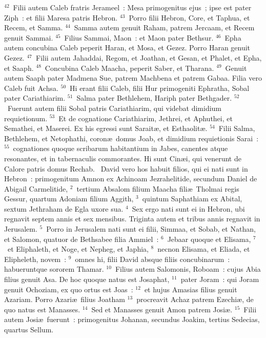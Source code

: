 ${}^{42}$~Filii autem Caleb fratris Jerameel~: Mesa primogenitus ejus~; ipse est pater Ziph~: et filii Maresa patris Hebron.
${}^{43}$~Porro filii Hebron, Core, et Taphua, et Recem, et Samma.
${}^{44}$~Samma autem genuit Raham, patrem Jercaam, et Recem genuit Sammai.
${}^{45}$~Filius Sammai, Maon~: et Maon pater Bethsur.
${}^{46}$~Epha autem concubina Caleb peperit Haran, et Mosa, et Gezez. Porro Haran genuit Gezez.
${}^{47}$~Filii autem Jahaddai, Regom, et Joathan, et Gesan, et Phalet, et Epha, et Saaph.
${}^{48}$~Concubina Caleb Maacha, peperit Saber, et Tharana.
${}^{49}$~Genuit autem Saaph pater Madmena Sue, patrem Machbena et patrem Gabaa. Filia vero Caleb fuit Achsa.
${}^{50}$~Hi erant filii Caleb, filii Hur primogeniti Ephratha, Sobal pater Cariathiarim.
${}^{51}$~Salma pater Bethlehem, Hariph pater Bethgader.
${}^{52}$~Fuerunt autem filii Sobal patris Cariathiarim, qui videbat dimidium requietionum.
${}^{53}$~Et de cognatione Cariathiarim, Jethrei, et Aphuthei, et Semathei, et Maserei. Ex his egressi sunt Sarait\ae , et Esthaolit\ae .
${}^{54}$~Filii Salma, Bethlehem, et Netophathi, coron\ae\ domus Joab, et dimidium requietionis Sarai~:
${}^{55}$~cognationes quoque scribarum habitantium in Jabes, canentes atque resonantes, et in tabernaculis commorantes. Hi sunt Cin\ae i, qui venerunt de Calore patris domus Rechab.
~David vero hos habuit filios, qui ei nati sunt in Hebron~: primogenitum Amnon ex Achinoam Jezrahelitide, secundum Daniel de Abigail Carmelitide,
${}^{2}$~tertium Absalom filium Maacha fili\ae\ Tholmai regis Gessur, quartum Adoniam filium Aggith,
${}^{3}$~quintum Saphathiam ex Abital, sextum Jethraham de Egla uxore sua.
${}^{4}$~Sex ergo nati sunt ei in Hebron, ubi regnavit septem annis et sex mensibus. Triginta autem et tribus annis regnavit in Jerusalem.
${}^{5}$~Porro in Jerusalem nati sunt ei filii, Simmaa, et Sobab, et Nathan, et Salomon, quatuor de Bethsabee filia Ammiel~:
${}^{6}$~Jebaar quoque et Elisama,
${}^{7}$~et Eliphaleth, et Noge, et Nepheg, et Japhia,
${}^{8}$~necnon Elisama, et Eliada, et Elipheleth, novem~:
${}^{9}$~omnes hi, filii David absque filiis concubinarum~: habueruntque sororem Thamar.
${}^{10}$~Filius autem Salomonis, Roboam~: cujus Abia filius genuit Asa. De hoc quoque natus est Josaphat,
${}^{11}$~pater Joram~: qui Joram genuit Ochoziam, ex quo ortus est Joas~:
${}^{12}$~et hujus Amasias filius genuit Azariam. Porro Azari\ae\ filius Joatham
${}^{13}$~procreavit Achaz patrem Ezechi\ae , de quo natus est Manasses.
${}^{14}$~Sed et Manasses genuit Amon patrem Josi\ae .
${}^{15}$~Filii autem Josi\ae\ fuerunt~: primogenitus Johanan, secundus Joakim, tertius Sedecias, quartus Sellum.

